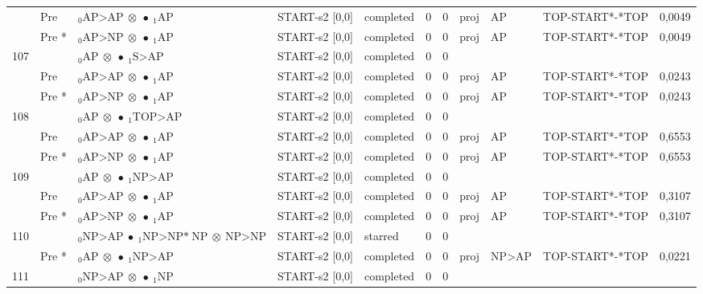 \documentclass[10pt]{article}
\begin{document}
\begin{longtable}[htbp]{lllllllllll}
 & Pre & $ {}_0 \textrm{AP>AP} \  \otimes \  \bullet \ {}_{1} \textrm{AP} $ & START-s2 [0,0] & completed & 0 & 0 & proj & AP & TOP-START*-*TOP & 0,0049 \\ 
 & Pre *& $ {}_0 \textrm{AP>NP} \  \otimes \  \bullet \ {}_{1} \textrm{AP} $ & START-s2 [0,0] & completed & 0 & 0 & proj & AP & TOP-START*-*TOP & 0,0049 \\ 
107 & & $ {}_0 \textrm{AP} \  \otimes \  \bullet \ {}_{1} \textrm{S>AP} $ & START-s2 [0,0] & completed & 0 & 0 & & & & \\ 
 & Pre & $ {}_0 \textrm{AP>AP} \  \otimes \  \bullet \ {}_{1} \textrm{AP} $ & START-s2 [0,0] & completed & 0 & 0 & proj & AP & TOP-START*-*TOP & 0,0243 \\ 
 & Pre *& $ {}_0 \textrm{AP>NP} \  \otimes \  \bullet \ {}_{1} \textrm{AP} $ & START-s2 [0,0] & completed & 0 & 0 & proj & AP & TOP-START*-*TOP & 0,0243 \\ 
108 & & $ {}_0 \textrm{AP} \  \otimes \  \bullet \ {}_{1} \textrm{TOP>AP} $ & START-s2 [0,0] & completed & 0 & 0 & & & & \\ 
 & Pre & $ {}_0 \textrm{AP>AP} \  \otimes \  \bullet \ {}_{1} \textrm{AP} $ & START-s2 [0,0] & completed & 0 & 0 & proj & AP & TOP-START*-*TOP & 0,6553 \\ 
 & Pre *& $ {}_0 \textrm{AP>NP} \  \otimes \  \bullet \ {}_{1} \textrm{AP} $ & START-s2 [0,0] & completed & 0 & 0 & proj & AP & TOP-START*-*TOP & 0,6553 \\ 
109 & & $ {}_0 \textrm{AP} \  \otimes \  \bullet \ {}_{1} \textrm{NP>AP} $ & START-s2 [0,0] & completed & 0 & 0 & & & & \\ 
 & Pre & $ {}_0 \textrm{AP>AP} \  \otimes \  \bullet \ {}_{1} \textrm{AP} $ & START-s2 [0,0] & completed & 0 & 0 & proj & AP & TOP-START*-*TOP & 0,3107 \\ 
 & Pre *& $ {}_0 \textrm{AP>NP} \  \otimes \  \bullet \ {}_{1} \textrm{AP} $ & START-s2 [0,0] & completed & 0 & 0 & proj & AP & TOP-START*-*TOP & 0,3107 \\ 
110 & & $ {}_0 \textrm{NP>AP} \  \bullet \ {}_{1} \textrm{NP>NP*} \ \textrm{NP} \  \otimes \ \textrm{NP>NP} $ & START-s2 [0,0] & starred & 0 & 0 & & & & \\ 
 & Pre *& $ {}_0 \textrm{AP} \  \otimes \  \bullet \ {}_{1} \textrm{NP>AP} $ & START-s2 [0,0] & completed & 0 & 0 & proj & NP>AP & TOP-START*-*TOP & 0,0221 \\ 
111 & & $ {}_0 \textrm{NP>AP} \  \otimes \  \bullet \ {}_{1} \textrm{NP} $ & START-s2 [0,0] & completed & 0 & 0 & & & & \\ 

\end{longtable}
\end{document}
